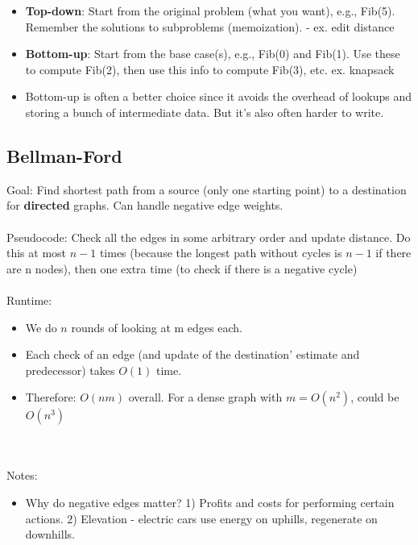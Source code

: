 \documentclass[12pt]{article}
\begin{document}
\begin{itemize}
    \item \textbf{Top-down}: Start from the original problem (what you want), e.g., Fib(5). Remember the solutions to subproblems (memoization). - ex. edit distance
    \item \textbf{Bottom-up}: Start from the base case(s), e.g., Fib(0) and Fib(1). Use these to compute Fib(2), then use this info to compute Fib(3), etc. ex. knapsack
    \item Bottom-up is often a better choice since it avoids the overhead of lookups and storing a bunch of intermediate data. But it's also often harder to write.
\end{itemize}

\subsection*{Bellman-Ford}
Goal: Find shortest path from a source (only one starting point) to a destination for \textbf{directed} graphs. Can handle negative edge weights. 
\\\\
Pseudocode: Check all the edges in some arbitrary order and update distance. Do this at most $n-1$ times (because the longest path without cycles is $n-1$ if there are n nodes), then one extra time (to check if there is a negative cycle)
\\\\
Runtime: 
\begin{itemize}
    \item We do $n$ rounds of looking at m edges each.
    \item Each check of an edge (and update of the destination' estimate and predecessor) takes $O(1)$ time.
    \item Therefore: $O(nm)$ overall. For a dense graph with $m = O(n^2)$, could be $O(n^3)$
\end{itemize}
\\\\
Notes:
\begin{itemize}
    \item Why do negative edges matter? 1) Profits and costs for performing certain actions. 2) Elevation - electric cars use energy on uphills, regenerate on downhills. 
\end{itemize}
\end{document}
